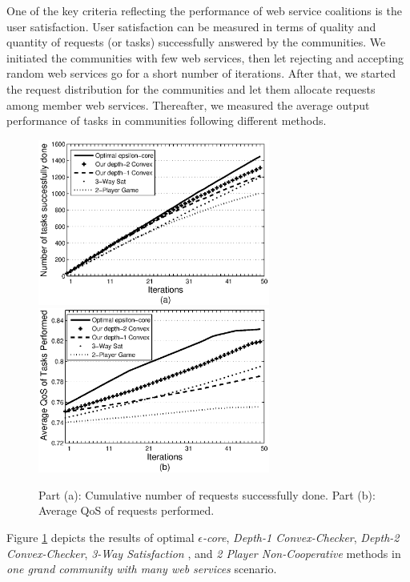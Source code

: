 \documentclass[10pt,journal,cspaper,compsoc]{IEEEtran}
\begin{document}
One of the key criteria reflecting the performance of web service
coalitions is the user satisfaction. User satisfaction can be
measured in terms of quality and quantity of requests (or tasks)
successfully answered by the communities. We initiated the
communities with few web services, then let rejecting and
accepting random web services go for a short number of iterations.
After that, we started the request distribution for the communities
and let them allocate requests among member web services.
Thereafter, we measured the average output performance of tasks in
communities following different methods.

\begin{figure}[!t]
\centering
\includegraphics[width=3in]{task_done_opt.eps}
\includegraphics[width=3in]{task_qos_opt.eps}
\caption{Part (a): Cumulative number of requests successfully
done. Part (b): Average QoS of requests performed.}
\label{performanceall}
\end{figure}

Figure \ref{performanceall} depicts the results of optimal
\emph{$\epsilon$-core}, \emph{Depth-1 Convex-Checker},
\emph{Depth-2 Convex-Checker}, \emph{3-Way Satisfaction}
\cite{DBLP:conf/IEEEscc/LimTMB12}, and \emph{2 Player
Non-Cooperative} \cite{DBLP:conf/IEEEscc/KhosravifarABT11} methods
in \emph{one grand community with many web services} scenario.
\end{document}
